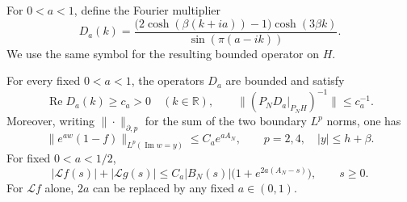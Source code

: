 For \(0<a<1\), define the Fourier multiplier
\begin{equation}
 D_a(k)=
 \frac{\bigl(2\cosh(\beta(k+ia))-1\bigr)\cosh(3\beta k)}
      {\sin(\pi(a-ik))}.
 \label{eq:05-multiplier}
\end{equation}
We use the same symbol for the resulting bounded operator on \(H\).

\begin{lemma}
\label{lem:05-hardy-interpolation}
For every fixed \(0<a<1\), the operators \(D_a\) are bounded and satisfy
\begin{equation}
 \operatorname{Re}D_a(k)\ge c_a>0
 \quad(k\in\mathbb R),\qquad
 \|(P_ND_a|_{P_NH})^{-1}\|\le c_a^{-1}.
 \label{eq:05-coercivity}
\end{equation}
Moreover, writing \(\|\cdot\|_{\partial,p}\) for the sum of the two boundary \(L^p\) norms, one has
\begin{equation}
 \|e^{aw}(1-f)\|_{L^p(\operatorname{Im}w=y)}
       \le C_a e^{aA_N},
 \qquad p=2,4,\quad |y|\le h+\beta.
 \label{eq:05-first-derivative-norms}
\end{equation}
For fixed \(0<a<1/2\),
\begin{equation}
 \bigl|\mathscr Lf(s)\bigr|+
 \bigl|\mathscr Lg(s)\bigr|
 \le C_a|B_N(s)|\bigl(1+e^{2a(A_N-s)}\bigr),
 \qquad s\ge0.
 \label{eq:05-jet-residual}
\end{equation}
For \(\mathscr Lf\) alone, \(2a\) can be replaced by any fixed \(a\in(0,1)\).
\end{lemma}

